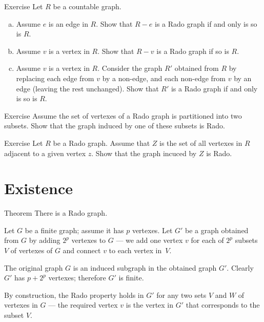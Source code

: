 \begin{thm}{Exercise}
Let $R$ be a countable graph. 
\begin{enumerate}[(a)]
 \item Assume  $e$ is an edge in $R$. 
 Show that $R-e$ is a Rado graph if and only is so is $R$.
 
 \item Assume $v$ is a vertex in $R$. 
 Show that $R-v$ is a Rado graph if so is $R$.
 
 \item Assume $v$ is a vertex in $R$. 
 Consider the graph $R'$ obtained from $R$ by replacing each edge from $v$ by a non-edge, and each non-edge from $v$ by an edge (leaving the rest unchanged).
 Show that $R'$ is a Rado graph if and only is so is $R$. 
\end{enumerate}

\end{thm}

\begin{thm}{Exercise}
Assume the set of vertexes of a Rado graph is partitioned into two subsets.
Show that the graph induced by one of these subsets is Rado.
\end{thm}

\begin{thm}{Exercise}
Let $R$ be a Rado graph.
Assume that $Z$ is the set of all vertexes in $R$ adjacent to a given vertex $z$.
Show that the graph incuced by $Z$ is Rado.
\end{thm}


\section*{Existence}

\begin{thm}{Theorem}
There is a Rado graph.
\end{thm}

Let $G$ be a finite graph; assume it has $p$ vertexes.
Let $G'$ be a graph obtained from $G$ by adding $2^p$ vertexes to $G$ --- we add one vertex $v$ for each of $2^p$ subsets $V$ of vertexes of $G$ and connect $v$ to each vertex in~$V$.

The original graph $G$ is an induced subgraph in the obtained graph $G'$.
Clearly $G'$ has $p+2^p$ vertexes; therefore $G'$ is finite.

By construction, the Rado property holds in $G'$ for any two sets $V$ and $W$ of vertexes in $G$ --- the required vertex $v$ is the vertex in $G'$ that corresponds to the subset $V$.


